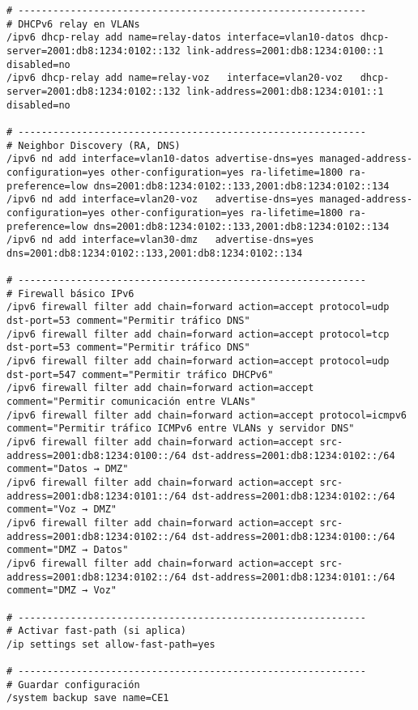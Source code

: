 \begin{lstlisting}[language=RouterOS]
# ------------------------------------------------------------
# DHCPv6 relay en VLANs
/ipv6 dhcp-relay add name=relay-datos interface=vlan10-datos dhcp-server=2001:db8:1234:0102::132 link-address=2001:db8:1234:0100::1 disabled=no
/ipv6 dhcp-relay add name=relay-voz   interface=vlan20-voz   dhcp-server=2001:db8:1234:0102::132 link-address=2001:db8:1234:0101::1 disabled=no

# ------------------------------------------------------------
# Neighbor Discovery (RA, DNS)
/ipv6 nd add interface=vlan10-datos advertise-dns=yes managed-address-configuration=yes other-configuration=yes ra-lifetime=1800 ra-preference=low dns=2001:db8:1234:0102::133,2001:db8:1234:0102::134
/ipv6 nd add interface=vlan20-voz   advertise-dns=yes managed-address-configuration=yes other-configuration=yes ra-lifetime=1800 ra-preference=low dns=2001:db8:1234:0102::133,2001:db8:1234:0102::134
/ipv6 nd add interface=vlan30-dmz   advertise-dns=yes dns=2001:db8:1234:0102::133,2001:db8:1234:0102::134

# ------------------------------------------------------------
# Firewall básico IPv6
/ipv6 firewall filter add chain=forward action=accept protocol=udp dst-port=53 comment="Permitir tráfico DNS"
/ipv6 firewall filter add chain=forward action=accept protocol=tcp dst-port=53 comment="Permitir tráfico DNS"
/ipv6 firewall filter add chain=forward action=accept protocol=udp dst-port=547 comment="Permitir tráfico DHCPv6"
/ipv6 firewall filter add chain=forward action=accept comment="Permitir comunicación entre VLANs"
/ipv6 firewall filter add chain=forward action=accept protocol=icmpv6 comment="Permitir tráfico ICMPv6 entre VLANs y servidor DNS"
/ipv6 firewall filter add chain=forward action=accept src-address=2001:db8:1234:0100::/64 dst-address=2001:db8:1234:0102::/64 comment="Datos → DMZ"
/ipv6 firewall filter add chain=forward action=accept src-address=2001:db8:1234:0101::/64 dst-address=2001:db8:1234:0102::/64 comment="Voz → DMZ"
/ipv6 firewall filter add chain=forward action=accept src-address=2001:db8:1234:0102::/64 dst-address=2001:db8:1234:0100::/64 comment="DMZ → Datos"
/ipv6 firewall filter add chain=forward action=accept src-address=2001:db8:1234:0102::/64 dst-address=2001:db8:1234:0101::/64 comment="DMZ → Voz"

# ------------------------------------------------------------
# Activar fast-path (si aplica)
/ip settings set allow-fast-path=yes

# ------------------------------------------------------------
# Guardar configuración
/system backup save name=CE1
\end{lstlisting}

